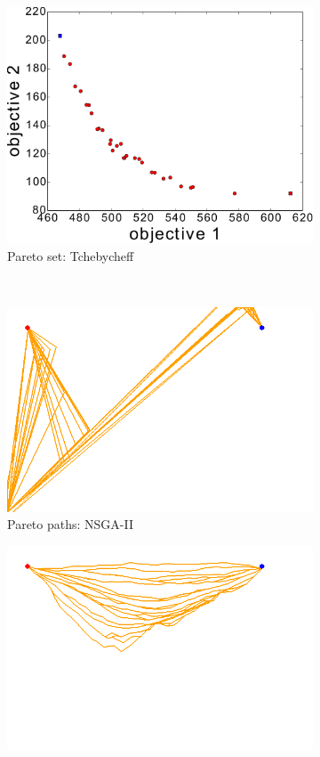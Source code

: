 \documentclass{article}
\begin{document}
\begin{figure}[h!]
\begin{subfigure}[b]{0.31\linewidth}
		\includegraphics[width=\textwidth]{fig/sim2-2obj/PF02-MORRT2.pdf}
		\caption{Pareto set: Tchebycheff}
		\label{fig:sim:norm:pf:c}
	\end{subfigure}  \\
	\begin{subfigure}[b]{0.31\linewidth}
		\centering
		\includegraphics[width=\textwidth]{fig/sim3-2obj/MOPath01-ALL.png}
		\caption{Pareto paths: NSGA-II}
		\label{fig:sim:norm:sols:a}
	\end{subfigure} 
	\begin{subfigure}[b]{0.31\linewidth}
		\centering
		\includegraphics[width=\textwidth]{fig/sim1-2obj/MORRTstar00-ALL.png}

\end{subfigure}
\end{figure}
\end{document}
